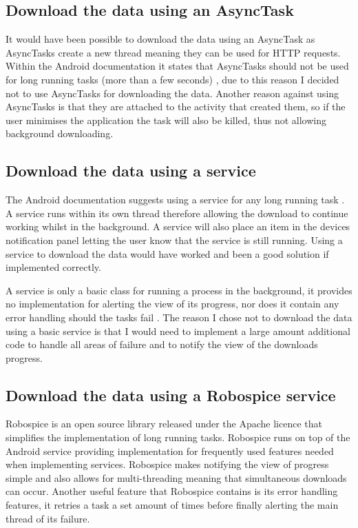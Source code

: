 \subsection{Download the data using an AsyncTask}

It would have been possible to download the data using an AsyncTask \cite{async_task} as AsyncTasks create a new thread meaning they can be used for HTTP requests. Within the Android documentation it states that AsyncTasks should not be used for long running tasks (more than a few seconds) \cite{async_task}, due to this reason I decided not to use AsyncTasks for downloading the data. Another reason against using AsyncTasks is that they are attached to the activity that created them, so if the user minimises the application the task will also be killed, thus not allowing background downloading.

\subsection{Download the data using a service}

The Android documentation suggests using a service \cite{service} for any long running task \cite{async_task}. A service runs within its own thread therefore allowing the download to continue working whilst in the background.  A service will also place an item in the devices notification panel letting the user know that the service is still running. Using a service to download the data would have worked and been a good solution if implemented correctly.

A service is only a basic class for running a process in the background, it provides no implementation for alerting the view of its progress, nor does it contain any error handling should the tasks fail \cite{service}. The reason I chose not to download the data using a basic service is that I would need to implement a large amount additional code to handle all areas of failure and to notify the view of the downloads progress.


\subsection{Download the data using a Robospice service}

Robospice \cite{robospice} is an open source library released under the Apache licence \cite{apache_licence} that simplifies the implementation of long running tasks. Robospice runs on top of the Android service providing implementation for frequently used features needed when implementing services. Robospice makes notifying the view of progress simple and also allows for multi-threading meaning that simultaneous downloads can occur. Another useful feature that Robospice contains is its error handling features, it retries a task a set amount of times \cite{robospice} before finally alerting the main thread of its failure.

